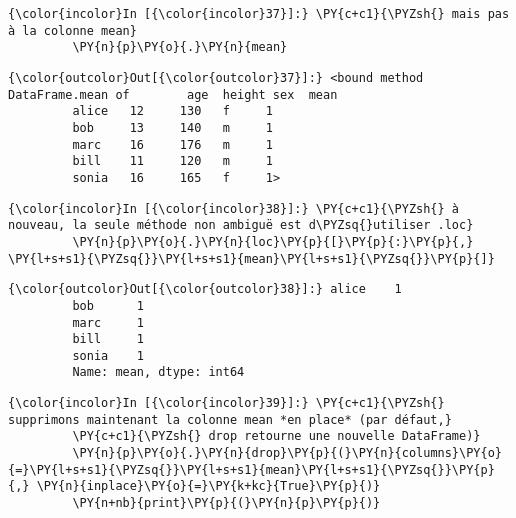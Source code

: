     \begin{Verbatim}[commandchars=\\\{\},frame=single,framerule=0.3mm,rulecolor=\color{cellframecolor}]
{\color{incolor}In [{\color{incolor}37}]:} \PY{c+c1}{\PYZsh{} mais pas à la colonne mean}
         \PY{n}{p}\PY{o}{.}\PY{n}{mean}
\end{Verbatim}


\begin{Verbatim}[commandchars=\\\{\},frame=single,framerule=0.3mm,rulecolor=\color{cellframecolor}]
{\color{outcolor}Out[{\color{outcolor}37}]:} <bound method DataFrame.mean of        age  height sex  mean
         alice   12     130   f     1
         bob     13     140   m     1
         marc    16     176   m     1
         bill    11     120   m     1
         sonia   16     165   f     1>
\end{Verbatim}
            
    \begin{Verbatim}[commandchars=\\\{\},frame=single,framerule=0.3mm,rulecolor=\color{cellframecolor}]
{\color{incolor}In [{\color{incolor}38}]:} \PY{c+c1}{\PYZsh{} à nouveau, la seule méthode non ambiguë est d\PYZsq{}utiliser .loc}
         \PY{n}{p}\PY{o}{.}\PY{n}{loc}\PY{p}{[}\PY{p}{:}\PY{p}{,} \PY{l+s+s1}{\PYZsq{}}\PY{l+s+s1}{mean}\PY{l+s+s1}{\PYZsq{}}\PY{p}{]}
\end{Verbatim}


\begin{Verbatim}[commandchars=\\\{\},frame=single,framerule=0.3mm,rulecolor=\color{cellframecolor}]
{\color{outcolor}Out[{\color{outcolor}38}]:} alice    1
         bob      1
         marc     1
         bill     1
         sonia    1
         Name: mean, dtype: int64
\end{Verbatim}
            
    \begin{Verbatim}[commandchars=\\\{\},frame=single,framerule=0.3mm,rulecolor=\color{cellframecolor}]
{\color{incolor}In [{\color{incolor}39}]:} \PY{c+c1}{\PYZsh{} supprimons maintenant la colonne mean *en place* (par défaut,}
         \PY{c+c1}{\PYZsh{} drop retourne une nouvelle DataFrame)}
         \PY{n}{p}\PY{o}{.}\PY{n}{drop}\PY{p}{(}\PY{n}{columns}\PY{o}{=}\PY{l+s+s1}{\PYZsq{}}\PY{l+s+s1}{mean}\PY{l+s+s1}{\PYZsq{}}\PY{p}{,} \PY{n}{inplace}\PY{o}{=}\PY{k+kc}{True}\PY{p}{)}
         \PY{n+nb}{print}\PY{p}{(}\PY{n}{p}\PY{p}{)}
\end{Verbatim}


